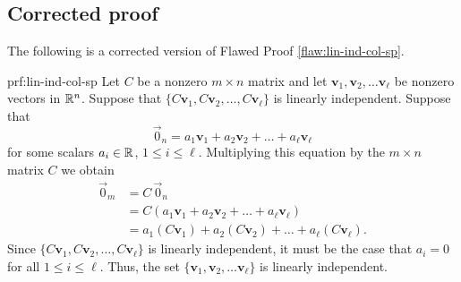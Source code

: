\clearpage
\subsection{Corrected proof}

The following is a corrected version of Flawed Proof \ref{flaw:lin-ind-col-sp}.
\begin{prf}{prf:lin-ind-col-sp}
Let $C$ be a nonzero $m\times n$ matrix and let $\bm{v}_1, \bm{v}_2,\ldots \bm{v}_\ell$ be nonzero vectors in $\mathbb R^n$.
Suppose that $\{C\bm{v}_1,C\bm{v}_2,\ldots, C\bm{v}_\ell\}$ is linearly independent.
Suppose that
\[
\vec{0}_n = a_1\bm{v}_1 + a_2\bm{v}_2 + \ldots + a_\ell\bm{v}_\ell
\]
for some scalars $a_i \in \mathbb R$, $1 \leq i \leq \ell$.  Multiplying this equation by the $m\times n$ matrix $C$ we obtain
\begin{align*}
	\vec{0}_m  & = C\, \vec{0}_n\\
	& = C(a_1\bm{v}_1 + a_2\bm{v}_2 + \ldots + a_\ell\bm{v}_\ell) \\
& = a_1(C\bm{v}_1) + a_2(C\bm{v}_2) + \ldots + a_\ell (C\bm{v}_\ell).
\end{align*}
Since $\{C\bm{v}_1,C\bm{v}_2,\ldots, C\bm{v}_\ell\}$ is linearly independent, it must be the case that $a_i = 0$ for all $1\leq i \leq \ell$.  Thus, the set $\{\bm{v}_1, \bm{v}_2,\ldots \bm{v}_\ell\}$ is linearly independent.
\end{prf} 